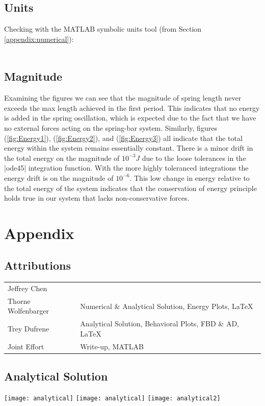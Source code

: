 \documentclass[12pt]{report}
\begin{document}
\begin{flushleft}
\subsection{Units}
Checking with the MATLAB symbolic units tool (from Section \ref{appendix:numerical}): \\
~\\

\subsection{Magnitude}
Examining the figures we can see that the magnitude of spring length never exceeds the max length achieved in the first period. This indicates that no energy is added in the spring oscillation, which is expected due to the fact that we have no external forces acting on the spring-bar system. Similarly, figures
(\ref{fig:Energy1}), (\ref{fig:Energy2}), and (\ref{fig:Energy3}) all indicate that the total energy within the system remains essentially constant. There is a minor drift in the total energy on the magnitude of $10^{-3}J$ due to the loose tolerances in the |ode45| integration function. With the more highly toleranced integrations the energy drift is on the magnitude of $10^{-6}$. This low change in energy relative to the total energy of the system indicates that the conservation of energy principle holds true in our system that lacks non-conservative forces.

\section{Appendix} \label{appendix}
\subsection{Attributions}
\onehalfspacing
\begin{tabular}{ll}
Jeffrey Chen & \\
Thorne Wolfenbarger & Numerical \& Analytical Solution, Energy Plots, \LaTeX \\
Trey Dufrene & Analytical Solution, Behavioral Plots, FBD \& AD, \LaTeX\\
Joint Effort & Write-up, MATLAB
\end{tabular}
\singlespacing
\subsection{Analytical Solution}
\center
\texttt{[image: analytical]}
\newpage
\texttt{[image: analytical]}
\texttt{[image: analytical2]}
\newpage

\end{flushleft}
\end{document}
